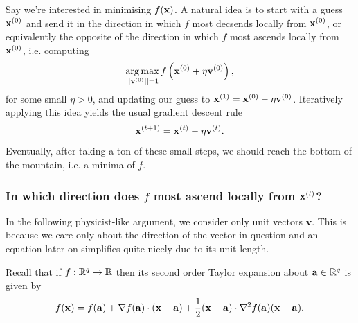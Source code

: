 \documentclass[11pt]{article}
\begin{document}
Say we're interested in minimising $f(\mathbf{x})$. A natural idea is to start with a guess $\mathbf{x}^{(0)}$ and send it in the direction in which $f$ most decsends locally from $\mathbf{x}^{(0)}$, or equivalently the opposite of the direction in which $f$ most ascends locally from $\mathbf{x}^{(0)}$, i.e. computing
$$
\operatorname*{arg\,max}_{||\mathbf{v}^{(0)}||=1}f\left(\mathbf{x}^{(0)}+\eta\mathbf{v}^{(0)}\right),
$$
for some small $\eta>0$, and updating our guess to $\mathbf{x}^{(1)}=\mathbf{x}^{(0)}-\eta\mathbf{v}^{(0)}$. Iteratively applying this idea yields the usual gradient descent rule
$$
\mathbf{x}^{(t+1)}
=
\mathbf{x}^{(t)}-\eta\mathbf{v}^{(t)}.
$$
Eventually, after taking a ton of these small steps, we should reach the bottom of the mountain, i.e. a minima of $f$.

\subsubsection{In which direction does $f$ most ascend locally from $\mathbf{x}^{(t)}$?}
In the following physicist-like argument, we consider only unit vectors $\mathbf{v}$. This is because we care only about the direction of the vector in question and an equation later on simplifies quite nicely due to its unit length. 

\begin{tcolorbox}[title={\centering\textbf{Multivariate Taylor expansion}}, colback=myLightBlue, colbacktitle=myDarkBlue, colframe=myDarkBlue, coltitle=white]
    Recall that if $f:\mathbb{R}^q\to\mathbb{R}$ then its second order Taylor expansion about $\mathbf{a}\in\mathbb{R}^q$ is given by
    $$
    f(\mathbf{x})
    =
    f(\mathbf{a})+\nabla f(\mathbf{a})\cdot(\mathbf{x}-\mathbf{a})+\frac{1}{2}(\mathbf{x}-\mathbf{a})\cdot\nabla^2 f(\mathbf{a})(\mathbf{x}-\mathbf{a}).
    $$
\end{tcolorbox}
\end{document}
